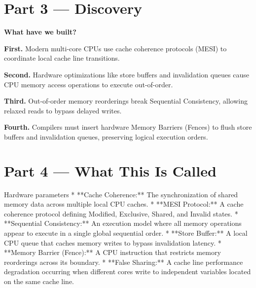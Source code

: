 \documentclass[12pt, a4paper]{book}
\begin{document}
\newpage

\section{Part 3 --- Discovery}

\begin{discoverybox}
\textbf{What have we built?}

\textbf{First.} Modern multi-core CPUs use cache coherence protocols (MESI) to coordinate local cache line transitions.

\textbf{Second.} Hardware optimizations like store buffers and invalidation queues cause CPU memory access operations to execute out-of-order.

\textbf{Third.} Out-of-order memory reorderings break Sequential Consistency, allowing relaxed reads to bypass delayed writes.

\textbf{Fourth.} Compilers must insert hardware Memory Barriers (Fences) to flush store buffers and invalidation queues, preserving logical execution orders.
\end{discoverybox}

\newpage

\section{Part 4 --- What This Is Called}

\begin{namedconcept}{Hardware parameters}
* **Cache Coherence:** The synchronization of shared memory data across multiple local CPU caches.
* **MESI Protocol:** A cache coherence protocol defining Modified, Exclusive, Shared, and Invalid states.
* **Sequential Consistency:** An execution model where all memory operations appear to execute in a single global sequential order.
* **Store Buffer:** A local CPU queue that caches memory writes to bypass invalidation latency.
* **Memory Barrier (Fence):** A CPU instruction that restricts memory reorderings across its boundary.
* **False Sharing:** A cache line performance degradation occurring when different cores write to independent variables located on the same cache line.
\end{namedconcept}

\newpage

\end{document}
